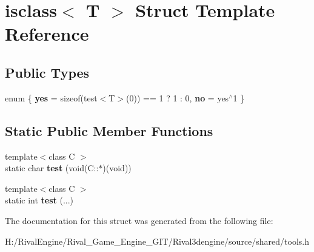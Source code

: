 \hypertarget{structisclass}{}\section{isclass$<$ T $>$ Struct Template Reference}
\label{structisclass}
\subsection*{Public Types}
\begin{DoxyCompactItemize}
\item 
\mbox{\label{structisclass_a554899063324afa81ba8729f6f3c5f1b}} 
enum \{ {\bfseries yes} = sizeof(test$<$T$>$(0)) == 1 ? 1 \+: 0, 
{\bfseries no} = yes$^\wedge$1
 \}
\end{DoxyCompactItemize}
\subsection*{Static Public Member Functions}
\begin{DoxyCompactItemize}
\item 
\mbox{\label{structisclass_a0ae7eb96e5d8ba90a090effb3eecf2a5}} 
{\footnotesize template$<$class C $>$ }\\static char {\bfseries test} (void(C\+::$\ast$)(void))
\item 
\mbox{\label{structisclass_a58ba5d4437eb95d26f126fcf1636cbff}} 
{\footnotesize template$<$class C $>$ }\\static int {\bfseries test} (...)
\end{DoxyCompactItemize}


The documentation for this struct was generated from the following file\+:\begin{DoxyCompactItemize}
\item 
H\+:/\+Rival\+Engine/\+Rival\+\_\+\+Game\+\_\+\+Engine\+\_\+\+G\+I\+T/\+Rival3dengine/source/shared/tools.\+h\end{DoxyCompactItemize}

